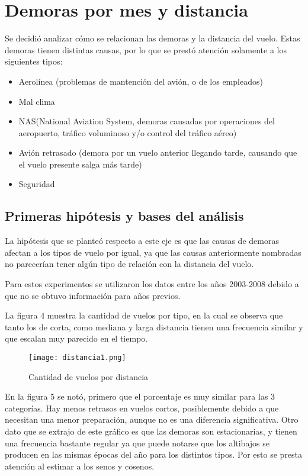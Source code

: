 \section{Demoras por mes y distancia}

Se decidió analizar cómo se relacionan las demoras y la distancia del vuelo. Estas demoras tienen distintas causas, por lo que se prestó atención solamente a los siguientes tipos:
\begin{itemize}
\item Aerolínea (problemas de mantención del avión, o de los empleados)
\item Mal clima
\item NAS(National Aviation System, demoras causadas por operaciones del aeropuerto, tráfico voluminoso y/o control del tráfico aéreo)
\item Avión retrasado (demora por un vuelo anterior llegando tarde, causando que el vuelo presente salga más tarde)
\item Seguridad
\end{itemize}

\subsection{Primeras hipótesis y bases del análisis}

La hipótesis que se planteó respecto a este eje es que las causas de demoras afectan a los tipos de vuelo por igual, ya que las causas anteriormente nombradas no parecerían tener algún tipo de relación con la distancia del vuelo.

Para estos experimentos se utilizaron los datos entre los años 2003-2008 debido a que no se obtuvo información para años previos.

La figura 4 muestra la cantidad de vuelos por tipo, en la cual se observa que tanto los de corta, como mediana y larga distancia tienen una frecuencia similar y que escalan muy parecido en el tiempo.

\begin{figure}[!ht]
\centering
\texttt{[image: distancia1.png]}
\caption{Cantidad de vuelos por distancia}
\label{distancia-1}
\end{figure}

En la figura 5 se notó, primero que el porcentaje es muy similar para las 3 categorías. Hay menos retrasos en vuelos cortos, posiblemente debido a que necesitan una menor preparación, aunque no es una diferencia significativa. Otro dato que se extrajo de este gráfico es que las demoras son estacionarias, y tienen una frecuencia bastante regular ya que puede notarse que los altibajos se producen en las mismas épocas del año para los distintos tipos. Por esto se presta atención al estimar a los senos y cosenos.

